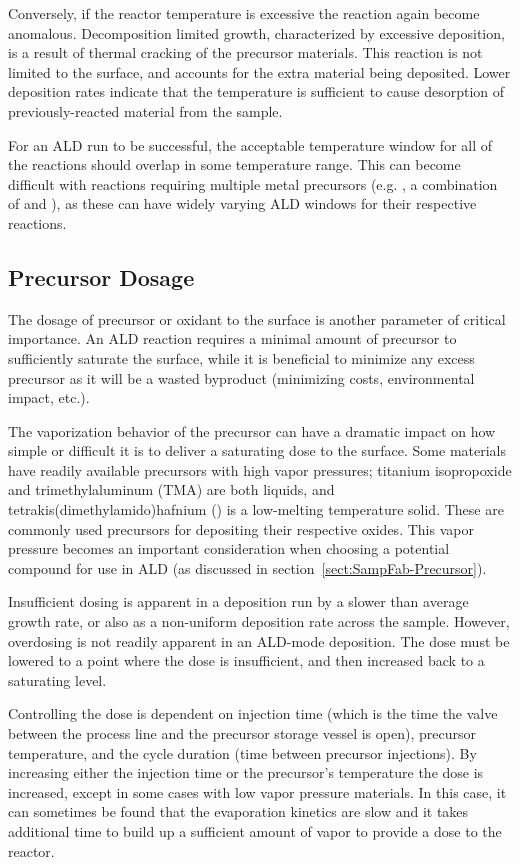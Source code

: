 Conversely, if the reactor temperature is excessive the reaction again become anomalous. Decomposition limited growth, characterized by excessive deposition, is a result of thermal cracking of the precursor materials. This reaction is not limited to the surface, and accounts for the extra material being deposited. Lower deposition rates indicate that the temperature is sufficient to cause desorption of previously-reacted material from the sample. 

For an ALD run to be successful, the acceptable temperature window for all of the reactions should overlap in some temperature range. This can become difficult with reactions requiring multiple metal precursors (e.g. \PTO, a combination of  and ), as these can have widely varying ALD windows for their respective reactions. 


\subsection{Precursor Dosage}

The dosage of precursor or oxidant to the surface is another parameter of critical importance. An ALD reaction requires a minimal amount of precursor to sufficiently saturate the surface, while it is beneficial to minimize any excess precursor as it will be a wasted byproduct (minimizing costs, environmental impact, etc.). 

The vaporization behavior of the precursor can have a dramatic impact on how simple or difficult it is to deliver a saturating dose to the surface. Some materials have readily available precursors with high vapor pressures; titanium isopropoxide and trimethylaluminum (TMA) are both liquids, and tetrakis(dimethylamido)hafnium () is a low-melting temperature solid. These are commonly used precursors for depositing their respective oxides. This vapor pressure becomes an important consideration when choosing a potential compound for use in ALD (as discussed in section~\vref{sect:SampFab-Precursor}).

Insufficient dosing is apparent in a deposition run by a slower than average growth rate, or also as a non-uniform deposition rate across the sample. However, overdosing is not readily apparent in an ALD-mode deposition. The dose must be lowered to a point where the dose is insufficient, and then increased back to a saturating level. 

Controlling the dose is dependent on injection time (which is the time the valve between the process line and the precursor storage vessel is open), precursor temperature, and the cycle duration (time between precursor injections). By increasing either the injection time or the precursor's temperature the dose is increased, except in some cases with low vapor pressure materials. In this case, it can sometimes be found that the evaporation kinetics are slow and it takes additional time to build up a sufficient amount of vapor to provide a dose to the reactor. 

